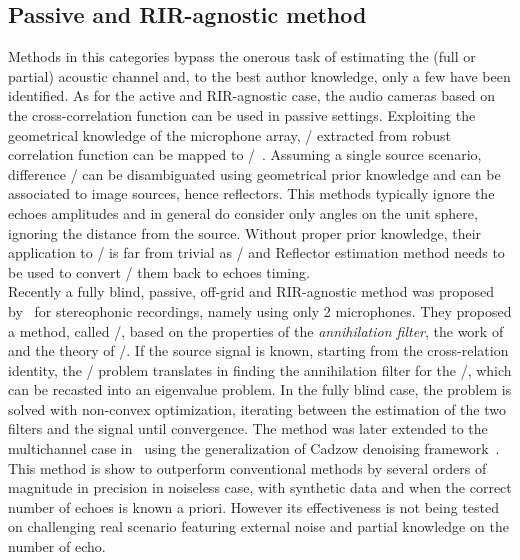 \subsection{Passive and RIR-agnostic method}
Methods in this categories bypass the onerous task of estimating the (full or partial) acoustic channel and, to the best author knowledge, only a few have been identified.
As for the active and RIR-agnostic case, the audio cameras based on the cross-correlation function can be used in passive settings.
Exploiting the geometrical knowledge of the microphone array, \TDOAs/ extracted from robust correlation function can be mapped to \DOAs/~.
Assuming a single source scenario, difference \DOAs/ can be disambiguated using geometrical prior knowledge and can be associated to image sources, hence reflectors.
This methods typically ignore the echoes amplitudes and in general do consider only angles on the unit sphere, ignoring the distance from the source.
Without proper prior knowledge, their application to \AER/ is far from trivial as \RooGE/ and Reflector estimation method needs to be used to convert \DOAs/ them back to echoes timing.
\\Recently a fully blind, passive, off-grid and RIR-agnostic method was proposed by~\citeauthor{tukuljac2018mulan} for stereophonic recordings, namely using only 2 microphones.
They proposed a method, called \MULAN/, based on the properties of the \textit{annihilation filter},
 the work of~ and the theory of \FRI/.
If the source signal is known, starting from the cross-relation identity, the \AER/ problem translates in finding the annihilation filter for the \RIRs/, which can be recasted into an eigenvalue problem.
In the fully blind case, the problem is solved with non-convex optimization, iterating between the estimation of the two filters and the signal until convergence.
The method was later extended to the multichannel case in~ using the generalization of Cadzow denoising framework~.
This method is show to outperform conventional methods by several orders of magnitude in precision in noiseless case, with synthetic data and when the correct number of echoes is known a priori.
However its effectiveness is not being tested on challenging real scenario featuring external noise and partial knowledge on the number of echo.


